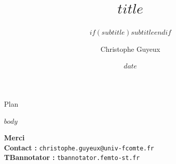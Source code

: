 \documentclass[10pt, aspectratio=169]{beamer}
\title{$title$}
\subtitle{$if(subtitle)$$subtitle$$endif$}
\author{Christophe Guyeux\inst{1}}
\institute{\inst{1}FEMTO-ST, DISC, Univ.\ Bourgogne Franche-Comt\'e}
\date{$date$}
\begin{document}
\begin{frame}[plain]\titlepage\end{frame}

\begin{frame}{Plan}
\tableofcontents[hideallsubsections]
\end{frame}

$body$

\begin{frame}[standout]
  \centering
  {\large\bfseries Merci}\\[12pt]
  \normalsize
  \textbf{Contact :} \texttt{christophe.guyeux@univ-fcomte.fr}\\[4pt]
  \textbf{TBannotator :} \texttt{tbannotator.femto-st.fr}
\end{frame}
\end{document}
